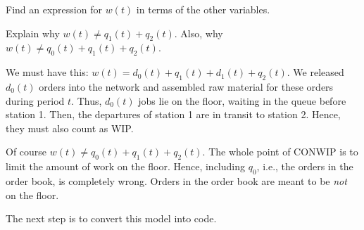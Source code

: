 \documentclass{scrartcl}
\begin{document}
\begin{exercise}
  Find an expression for $w(t)$ in terms of the other variables. 

  \hintsymbol
\begin{hint}

  Explain why $w(t) \neq q_1(t) + q_2(t)$.
  Also, why $w(t) \neq q_0(t) + q_1(t) + q_2(t)$.
\end{hint}

\begin{solution}
    We must have this: $w(t) = d_0(t) + q_1(t) + d_1(t) + q_2(t)$.
    We released $d_0(t)$ orders into the network and assembled raw material for these orders during period $t$.
    Thus, $d_0(t)$ jobs lie on the floor, waiting in the queue before station 1.
    Then, the departures of station 1 are in transit to station 2.
    Hence, they must also count as WIP.


    Of course $w(t) \neq q_0(t) + q_1(t) + q_2(t)$.
    The whole point of CONWIP is to limit the amount of work on the floor.
    Hence, including $q_0$, i.e., the orders in the order book, is completely wrong.
    Orders in the order book are meant to be \emph{not} on the floor.
    \end{solution}
\end{exercise}


The next step is to convert this model into code. 




\end{document}
